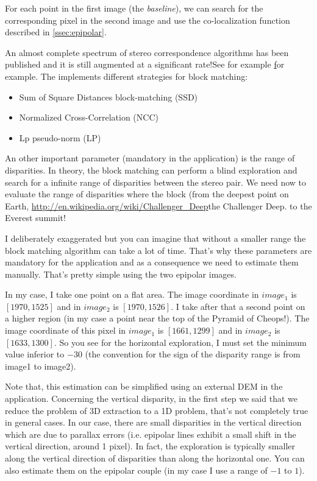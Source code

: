 For each point in the first image (the \textit{baseline}), we can search for the
corresponding pixel in the second image and use the co-localization function
described in \ref{ssec:epipolar}.

An almost complete spectrum of stereo correspondence algorithms has been
published and it is still augmented at a significant rate!See for example
\href{http://en.wikipedia.org/wiki/Block-matching_algorithm} for example. The
\otb implements different strategies for block matching:

\begin{itemize}
\item Sum of Square Distances block-matching (SSD)
\item Normalized Cross-Correlation (NCC)
\item Lp pseudo-norm (LP)
\end{itemize}

An other important parameter (mandatory in the application) is the range of
disparities. In theory, the block matching can perform a blind exploration and
search for a infinite range of disparities between the stereo pair. We need now
to evaluate the range of disparities where the block (from the deepest point on
Earth, \url{http://en.wikipedia.org/wiki/Challenger_Deep}{the Challenger Deep}.
to the Everest summit!

I deliberately exaggerated but you can imagine that without a smaller range 
the block matching algorithm can take a lot of time.  That's why
these parameters are mandatory for the application and as a consequence we need to
estimate them manually. That's pretty simple using the two epipolar images.

In my case, I take one point on a flat area. The image coordinate in $image_{1}$
is $[1970,1525]$ and in $image_{2}$ is $[1970,1526]$. I take after that a second
point on a higher region (in my case a point near the top of the Pyramid of
Cheops!). The image coordinate of this pixel in $image_{1}$ is $[1661,1299]$ and
in $image_{2}$ is $[1633,1300]$.  So you see for the horizontal exploration, I
must set the minimum value inferior to $-30$ (the convention for the sign of the
disparity range is from image1 to image2).

Note that, this estimation can be simplified using an external DEM in the
 application. Concerning the
vertical disparity, in the first step we said that we reduce the problem of 3D
extraction to a 1D problem, that's not completely true in general cases. In our
case, there are small disparities in the vertical direction which are due to
parallax errors (i.e. epipolar lines exhibit a small shift in the vertical
direction, around 1 pixel). In fact, the exploration is typically smaller along 
the vertical direction of disparities than along the horizontal one. You can also estimate
them on the epipolar couple (in my case I use a range of $-1$ to $1$).

